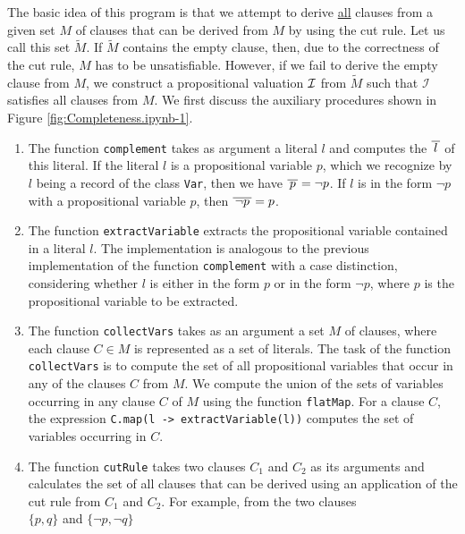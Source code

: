 The basic idea
of this program is that we attempt to derive \underline{all} clauses from a given set $M$ of clauses
that can be derived from $M$ by using the cut rule.  Let us call this set $\widetilde{M}$.  If $\widetilde{M}$ contains the empty clause,
then, due to the correctness of the cut rule, $M$ has to be unsatisfiable. However, if we fail to derive the empty clause from $M$,
we construct a propositional valuation
$\mathcal{I}$ from $\widetilde{M}$ such that $\mathcal{I}$ satisfies all clauses from $M$.
We first discuss the auxiliary procedures shown in Figure \ref{fig:Completeness.ipynb-1}.
\begin{enumerate}
\item The function \texttt{complement} takes as argument a literal $l$ and computes the
       $\overline{\,l\,}$ of this literal.
      If the literal $l$ is a propositional variable $p$, which we recognize by $l$ being a record of the
      class \texttt{Var}, then we have $\overline{\,p\,} = \neg p$.
      If $l$ is in the form $\neg p$ with a propositional variable $p$, then $\overline{\,\neg p\,} =
      p$.
\item The function \texttt{extractVariable} extracts the propositional variable contained in a literal $l$.
      The implementation is analogous to the previous implementation of the function 
      \texttt{complement} with a case distinction, considering whether $l$ is either in the form
      $p$ or in the form $\neg p$, where $p$ is the propositional variable to be extracted.
\item The function \texttt{collectVars} takes as an argument a set $M$ of clauses, where each
      clause \mbox{$C \!\in\! M$} is represented as a set of literals. The task of the
      function \texttt{collectVars} is to compute the set of all propositional variables
      that occur in any of the clauses $C$ from $M$. We compute the union of the sets of variables occurring
      in any clause $C$ of $M$ using the function \texttt{flatMap}.  For a clause $C$, the expression
      \texttt{C.map(l -> extractVariable(l))} computes the set of variables occurring in $C$.
\item The function \texttt{cutRule} takes two clauses $C_1$ and $C_2$ as its arguments and calculates
      the set of all clauses that can be derived using an application of the cut rule from $C_1$ and $C_2$.
      For example, from the two clauses
      \\[0.2cm]
      \hspace*{1.3cm}
      $\{ p, q \}$ \quad and \quad $\{ \neg p, \neg q \}$ 

\end{enumerate}
